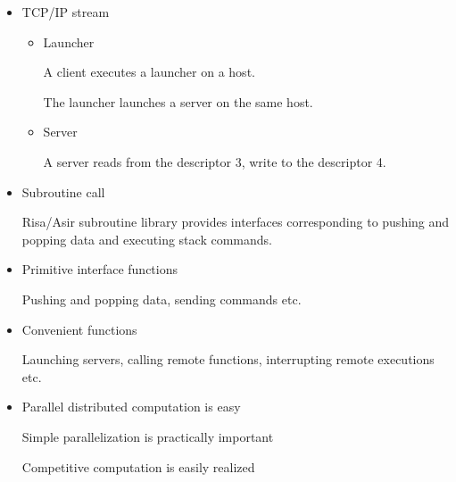 \begin{slide}{}

\begin{itemize}
\item TCP/IP stream

\begin{itemize}
\item Launcher

A client executes a launcher on a host.

The launcher launches a server on the same host.

\item Server

A server reads from the descriptor 3, write to the descriptor 4.

\end{itemize}

\item Subroutine call

Risa/Asir subroutine library provides interfaces corresponding to
pushing and popping data and executing stack commands.
\end{itemize}
\end{slide}

\begin{slide}{}

\begin{itemize}
\item Primitive interface functions

Pushing and popping data, sending commands etc.

\item Convenient functions

Launching servers, calling remote functions,
 interrupting remote executions etc.

\item Parallel distributed computation is easy

Simple parallelization is practically important

Competitive computation is easily realized 
\end{itemize}
\end{slide}


